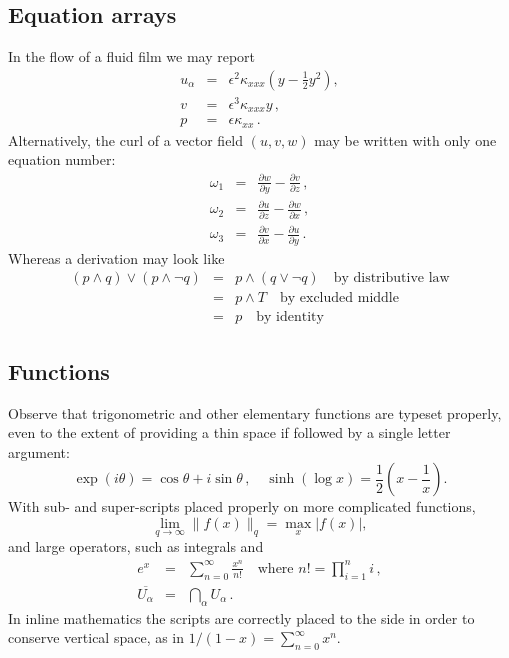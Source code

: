 \documentclass[9pt]{memoir}
\begin{document}
\subsection{Equation arrays}

In the flow of a fluid film we may report
\begin{eqnarray}
	u_\alpha & = & \epsilon^2 \kappa_{xxx} 
	\left( y-\frac{1}{2}y^2 \right),
	\label{equ}  \\
	v & = & \epsilon^3 \kappa_{xxx} y\,,
	\label{eqv}  \\
	p & = & \epsilon \kappa_{xx}\,.
	\label{eqp}
\end{eqnarray}
Alternatively, the curl of a vector field $(u,v,w)$ may be written 
with only one equation number:
\begin{eqnarray}
	\omega_1 & = &
	\frac{\partial w}{\partial y}-\frac{\partial v}{\partial z}\,,
	\nonumber  \\
	\omega_2 & = & 
	\frac{\partial u}{\partial z}-\frac{\partial w}{\partial x}\,,
	\label{eqcurl}  \\
	\omega_3 & = & 
	\frac{\partial v}{\partial x}-\frac{\partial u}{\partial y}\,.
	\nonumber
\end{eqnarray}
Whereas a derivation may look like
\begin{eqnarray*}
	(p\wedge q)\vee(p\wedge\neg q) & = & p\wedge(q\vee\neg q)
	\quad\text{by distributive law}  \\
	 & = & p\wedge T \quad\text{by excluded middle}  \\
	 & = & p \quad\text{by identity}
\end{eqnarray*}

\subsection{Functions}

Observe that trigonometric and other elementary functions are typeset 
properly, even to the extent of providing a thin space if followed by 
a single letter argument:
\[
	\exp(i\theta)=\cos\theta +i\sin\theta\,,\quad
	\sinh(\log x)=\frac{1}{2}\left( x-\frac{1}{x} \right).
\]
With sub- and super-scripts placed properly on more complicated 
functions,
\[
	\lim_{q\to\infty}\|f(x)\|_q 
	=\max_{x}|f(x)|,
\]
and large operators, such as integrals and
\begin{eqnarray*}
	e^x & = & \sum_{n=0}^\infty \frac{x^n}{n!}
	\quad\text{where }n!=\prod_{i=1}^n i\,,  \\
	\overline{U_\alpha} & = & \bigcap_\alpha U_\alpha\,.
\end{eqnarray*}
In inline mathematics the scripts are correctly placed to the side in 
order to conserve vertical space, as in
\(
	1/(1-x)=\sum_{n=0}^\infty x^n.
\)
\end{document}
